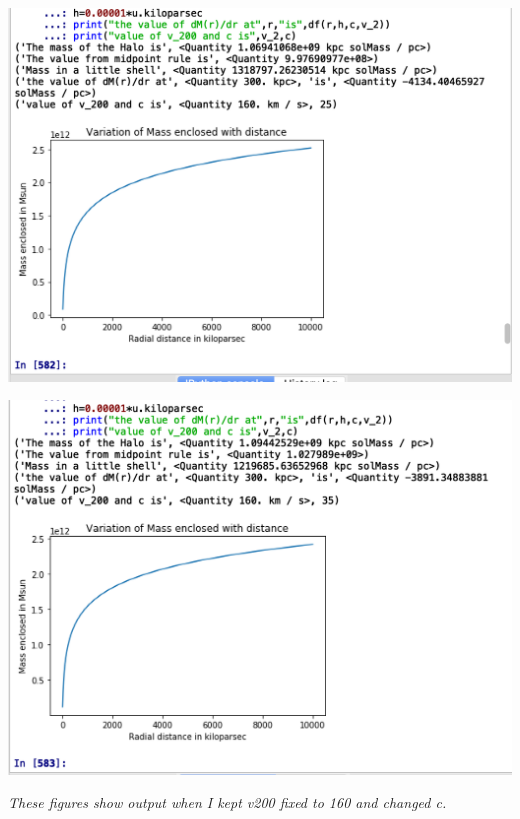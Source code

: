 \documentclass{article}
\begin{document}
\begin{center}
\begin{multicols}{2}
	\begin{center}
        \includegraphics[scale=0.25]{Images/25}
        \end{center}
\columnbreak
	\begin{center}
       \includegraphics[scale=0.25]{Images/35}
       \end{center}
\end{multicols}
\end{center}


\emph{\small{These figures show output when I kept v200 fixed to 160 and changed c.}}
\vspace{0.5em}
\end{document}
